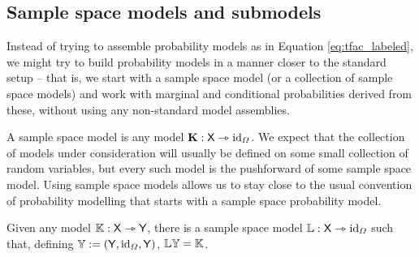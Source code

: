 \subsection{Sample space models and submodels}

Instead of trying to assemble probability models as in Equation \ref{eq:tfac_labeled}, we might try to build probability models in a manner closer to the standard setup -- that is, we start with a sample space model (or a collection of sample space models) and work with marginal and conditional probabilities derived from these, without using any non-standard model assemblies.

A sample space model is any model $\mathbf{K}:\mathsf{X}\rightarrowtriangle \text{id}_\Omega$. We expect that the collection of models under consideration will usually be defined on some small collection of random variables, but every such model is the pushforward of some sample space model. Using sample space models allows us to stay close to the usual convention of probability modelling that starts with a sample space probability model.

\begin{lemma}\label{lem:ss_exist}
Given any model $\mathbb{K}:\mathsf{X}\rightarrowtriangle \mathsf{Y}$, there is a sample space model $\mathbb{L}:\mathsf{X}\rightarrowtriangle\text{id}_\Omega$ such that, defining $\mathbb{Y}:=(\mathsf{Y},\text{id}_\Omega,\mathsf{Y})$, $\mathbb{L}\mathbb{Y}=\mathbb{K}$.
\end{lemma}

